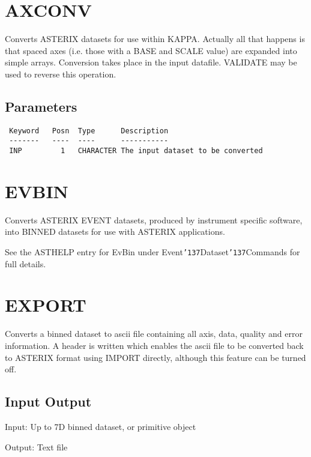\documentclass{book}
\renewcommand{\_}{{\tt\char'137}}     %
\begin{document}
\section{AXCONV}
Converts ASTERIX datasets for use within KAPPA. Actually all that happens
is that spaced axes (i.e. those with a BASE and SCALE value) are
expanded into simple arrays. Conversion takes place in the input
datafile. VALIDATE may be used to reverse this operation.

\subsection{Parameters}
\begin{verbatim}
 Keyword   Posn  Type      Description
 -------   ----  ----      -----------
 INP         1   CHARACTER The input dataset to be converted

\end{verbatim}\section{EVBIN}
Converts ASTERIX EVENT datasets, produced by instrument specific
software, into BINNED datasets for use with ASTERIX applications.

See the ASTHELP entry for EvBin under Event\_Dataset\_Commands for
full details.

\section{EXPORT}
Converts a binned dataset to ascii file containing all axis, data,
quality and error information. A header is written which enables
the ascii file to be converted back to ASTERIX format using IMPORT
directly, although this feature can be turned off.

\subsection{Input Output}
Input: Up to 7D binned dataset, or primitive object

Output: Text file
\end{document}
